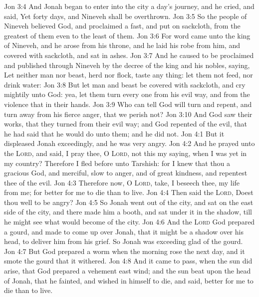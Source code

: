 \vs Jon 3:4 And Jonah began to enter into the city a day's journey, and he cried, and said, Yet forty days, and Nineveh shall be overthrown.
\vs Jon 3:5 So the people of Nineveh believed God, and proclaimed a fast, and put on sackcloth, from the greatest of them even to the least of them.
\vs Jon 3:6 For word came unto the king of Nineveh, and he arose from his throne, and he laid his robe from him, and covered  with sackcloth, and sat in ashes.
\vs Jon 3:7 And he caused  to be proclaimed and published through Nineveh by the decree of the king and his nobles, saying, Let neither man nor beast, herd nor flock, taste any thing: let them not feed, nor drink water:
\vs Jon 3:8 But let man and beast be covered with sackcloth, and cry mightily unto God: yea, let them turn every one from his evil way, and from the violence that  in their hands.
\vs Jon 3:9 Who can tell  God will turn and repent, and turn away from his fierce anger, that we perish not?
\vs Jon 3:10 And God saw their works, that they turned from their evil way; and God repented of the evil, that he had said that he would do unto them; and he did  not.
\vs Jon 4:1 But it displeased Jonah exceedingly, and he was very angry.
\vs Jon 4:2 And he prayed unto the \textsc{Lord}, and said, I pray thee, O \textsc{Lord},  not this my saying, when I was yet in my country? Therefore I fled before unto Tarshish: for I knew that thou  a gracious God, and merciful, slow to anger, and of great kindness, and repentest thee of the evil.
\vs Jon 4:3 Therefore now, O \textsc{Lord}, take, I beseech thee, my life from me; for  better for me to die than to live.
\vs Jon 4:4 Then said the \textsc{Lord}, Doest thou well to be angry?
\vs Jon 4:5 So Jonah went out of the city, and sat on the east side of the city, and there made him a booth, and sat under it in the shadow, till he might see what would become of the city.
\vs Jon 4:6 And the \textsc{Lord} God prepared a gourd, and made  to come up over Jonah, that it might be a shadow over his head, to deliver him from his grief. So Jonah was exceeding glad of the gourd.
\vs Jon 4:7 But God prepared a worm when the morning rose the next day, and it smote the gourd that it withered.
\vs Jon 4:8 And it came to pass, when the sun did arise, that God prepared a vehement east wind; and the sun beat upon the head of Jonah, that he fainted, and wished in himself to die, and said,  better for me to die than to live.
